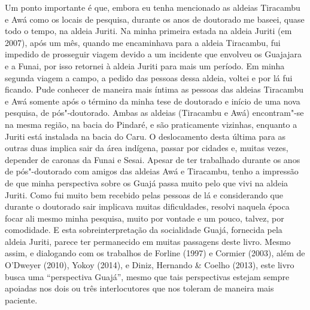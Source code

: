 Um ponto importante é que, embora eu tenha mencionado as aldeias
Tiracambu e Awá como os locais de pesquisa, durante os anos de doutorado
me baseei, quase todo o tempo, na aldeia Juriti. Na minha primeira
estada na aldeia Juriti (em 2007), após um mês, quando me encaminhava
para a aldeia Tiracambu, fui impedido de prosseguir viagem devido a um
incidente que envolveu os Guajajara e a Funai, por isso retornei à
aldeia Juriti para mais um período. Em minha segunda viagem a campo, a
pedido das pessoas dessa aldeia, voltei e por lá fui ficando.
Pude conhecer de maneira mais íntima as pessoas das aldeias Tiracambu e Awá somente
após o término da minha tese de doutorado e início de uma nova pesquisa,
de pós"-doutorado. Ambas as aldeias (Tiracambu e Awá) encontram"-se na
mesma região, na bacia do Pindaré, e são praticamente vizinhas, enquanto
a Juriti está instalada na bacia do Caru. O deslocamento desta última
para as outras duas implica sair da área indígena, passar por cidades e,
muitas vezes, depender de caronas da Funai e Sesai. Apesar de ter
trabalhado durante os anos de pós"-doutorado com amigos das aldeias Awá
e Tiracambu, tenho a impressão de que minha perspectiva sobre os Guajá
passa muito pelo que vivi na aldeia Juriti. Como fui muito bem recebido
pelas pessoas de lá e considerando que durante o doutorado sair
implicava muitas dificuldades, resolvi naquela época focar ali mesmo
minha pesquisa, muito por vontade e um pouco, talvez, por comodidade. E
esta sobreinterpretação da socialidade Guajá, fornecida pela aldeia
Juriti, parece ter permanecido em muitas passagens deste livro. Mesmo
assim, e dialogando com os trabalhos de Forline (1997) e Cormier (2003),
além de O'Dweyer (2010), Yokoy (2014), e Diniz, Hernando \& Coelho
(2013), este livro busca uma ``perspectiva Guajá'', mesmo que tais
perspectivas estejam sempre apoiadas nos dois ou três interlocutores que
nos toleram de maneira mais paciente.

